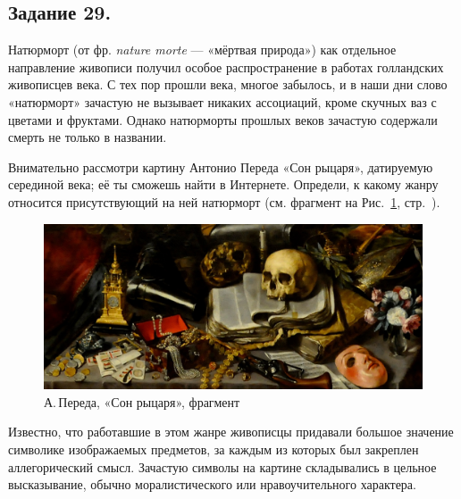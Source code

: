 \subsection*{Задание 29.}
Натюрморт (от фр. \textit{nature morte} — «мёртвая природа») как отдельное направление живописи получил особое распространение в работах голландских живописцев  века. С тех пор прошли века, многое забылось, и в наши дни слово «натюрморт» зачастую не вызывает никаких ассоциаций, кроме скучных ваз с цветами и фруктами. Однако натюрморты прошлых веков зачастую содержали смерть не только в названии. 
\begin{list}{)}{\leftmargin=6mm  \topsep=0mm  \itemsep=0pt \parsep=0mm \itemindent=-1pt}
\item Внимательно рассмотри картину Антонио Переда «Сон рыцаря», датируемую серединой  века; её ты сможешь найти в Интернете.  Определи, к какому жанру относится присутствующий на ней натюрморт (см. фрагмент на Рис.~\ref{son}, стр.~\pageref{son}).
    
\begin{figure}
\includegraphics[width=\textwidth]{images/image1-17.jpeg}
\caption{\label{son}А.\,Переда, «Сон рыцаря», фрагмент}
\end{figure}
    
\hspace*{5mm}Известно, что работавшие в этом жанре живописцы придавали большое значение символике изображаемых предметов, за каждым из которых был закреплен аллегорический смысл. Зачастую символы на картине складывались в цельное высказывание, обычно моралистического или нравоучительного характера. 


\end{list}
